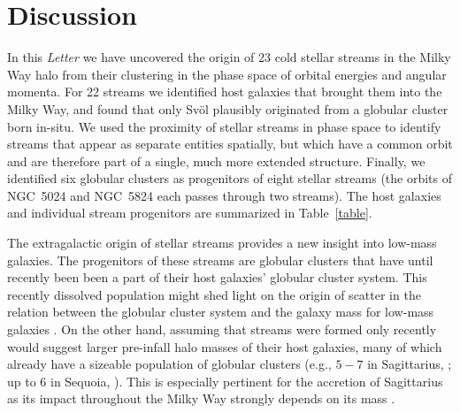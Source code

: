 \documentclass[twocolumn]{aastex63}
\begin{document}
\section{Discussion}
\label{sec:discussion}

In this {\it Letter} we have uncovered the origin of 23 cold stellar streams in the Milky Way halo from their clustering in the phase space of orbital energies and angular momenta.
For 22 streams we identified host galaxies that brought them into the Milky Way, and found that only Sv\" ol plausibly originated from a globular cluster born in-situ.
We used the proximity of stellar streams in phase space to identify streams that appear as separate entities spatially, but which have a common orbit and are therefore part of a single, much more extended structure.
Finally, we identified six globular clusters as progenitors of eight stellar streams (the orbits of NGC~5024 and NGC~5824 each passes through two streams).
The host galaxies and individual stream progenitors are summarized in Table~\ref{table}.

The extragalactic origin of stellar streams provides a new insight into low-mass galaxies.
The progenitors of these streams are globular clusters that have until recently been been a part of their host galaxies' globular cluster system.
This recently dissolved population might shed light on the origin of scatter in the relation between the globular cluster system and the galaxy mass for low-mass galaxies \citep[e.g.,][]{harris2013}.
On the other hand, assuming that streams were formed only recently would suggest larger pre-infall halo masses of their host galaxies, many of which already have a sizeable population of globular clusters (e.g., $5-7$ in Sagittarius, \citealt{Johnson2020}; up to 6 in Sequoia, \citealt{myeong2019}).
This is especially pertinent for the accretion of Sagittarius as its impact throughout the Milky Way strongly depends on its mass \citep{laporte2019}.
\end{document}
